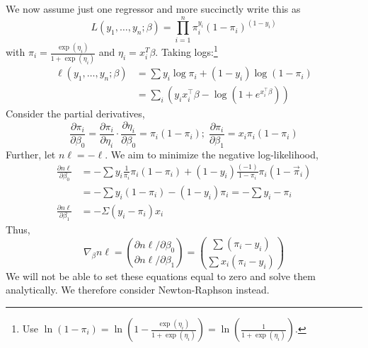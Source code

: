 \documentclass[11pt, %
	oneside, %
	english, %
	onehalfspacing, %
	]{article} %
\numberwithin{equation}{section}
\begin{document}
We now assume just one regressor and more succinctly write this as
\begin{equation*}
    L\left(y_1, \ldots, y_n; \beta\right)=\prod_{i=1}^n \pi_i^{y_i}\left(1-\pi_i\right)^{\left(1-y_i\right)}
\end{equation*}
with $\pi_i = \frac{\exp (\eta_i)}{1+ \exp (\eta_i)}$ and $\eta_i = x_i^T \beta$. Taking logs:\footnote{Use $\ln (1- \pi_i) = \ln \left( 1- \frac{\exp (\eta_i)}{1+ \exp (\eta_i)}\right) = \ln \left(\frac{1}{1+\exp (\eta_i)}\right)$.}
\begin{align*}
    \ell\left(y_1, \ldots, y_n ; \beta\right)&=\sum y_i \log \pi_i+\left(1-y_i\right) \log \left(1-\pi_i\right)\\
    & =\sum_i \left( y_i x_i^{\top} \beta-\log \left(1+e^{x_i^{\top} \beta}\right)\right)
\end{align*}
Consider the partial derivatives,
\begin{equation*}
    \frac{\partial \pi_i}{\partial \beta_0}=\frac{\partial \pi_i}{\partial \eta_i} \cdot \frac{\partial \eta_i}{\partial \beta_0}=\pi_i\left(1-\pi_i\right) ; \; \frac{\partial \pi_i}{\partial \beta_1}=x_i \pi_i\left(1-\pi_i\right)
\end{equation*}
Further, let $n\ell = - \ell$. We aim to minimize the negative log-likelihood,
\begin{equation*}
    \begin{aligned}
        \frac{\partial n\ell}{\partial \beta_0} & =-\sum y_i \frac{1}{\pi_i} \pi_i\left(1-\pi_i\right)+\left(1-y_i\right) \frac{(-1)}{1-\pi_i} \pi_i\left(1-\vec{\pi}_i\right) \\
        & =-\sum y_i\left(1-\pi_i\right)-\left(1-y_i\right) \pi_i=-\sum y_i-\pi_i \\
        \frac{\partial n \ell}{\partial \beta_1}&=-\Sigma\left(y_i-\pi_i\right) x_i
    \end{aligned}
\end{equation*}
Thus,
\begin{equation*}
    \nabla_{\beta} n \ell=\binom{\partial n \ell / \partial \beta_0}{\partial n \ell / \partial \beta_1}=\binom{\sum\left(\pi_i-y_i\right)}{\sum x_i\left(\pi_i-y_i\right)}
\end{equation*}
We will not be able to set these equations equal to zero and solve them analytically. We therefore consider Newton-Raphson instead.
\end{document}
